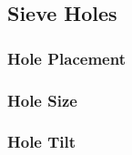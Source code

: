 \subsection{Sieve Holes}

\subsubsection{Hole Placement}

\subsubsection{Hole Size}

\subsubsection{Hole Tilt}


